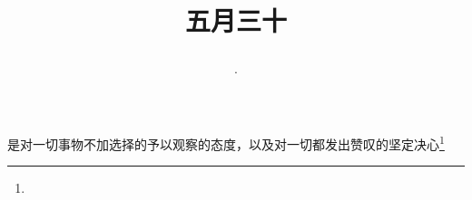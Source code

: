 \title{\date[d=5,m=7,y=2024][year:cn-y,年,month:cn,day:cn,日,·,weekday]·五月三十 }
是对一切事物不加选择的予以观察的态度，以及对一切都发出赞叹的坚定决心\footnote{ }

